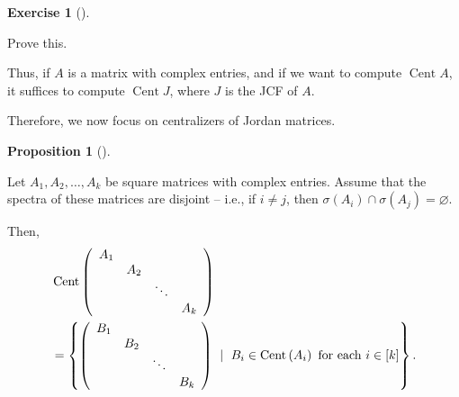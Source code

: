 \documentclass[numbers=enddot,12pt,final,onecolumn,notitlepage]{scrartcl}%
\newcounter{exer}
\numberwithin{exer}{subsection}
\theoremstyle{definition}
\newtheorem{prop}[theo]{Proposition}
\newenvironment{proposition}[1][]
{\begin{prop}[#1]\begin{leftbar}}
{\end{leftbar}\end{prop}}
\newtheorem{exmp}[exer]{Exercise}
\newenvironment{exercise}[1][]
{\begin{exmp}[#1]\begin{leftbar}}
{\end{leftbar}\end{exmp}}
\begin{document}
\begin{exercise}
 Prove this.
\end{exercise}

Thus, if $A$ is a matrix with complex entries, and if we want to compute
$\operatorname*{Cent}A$, it suffices to compute $\operatorname*{Cent}J$, where
$J$ is the JCF of $A$.

Therefore, we now focus on centralizers of Jordan matrices.

\begin{proposition}
Let $A_{1},A_{2},\ldots,A_{k}$ be square matrices with complex entries. Assume
that the spectra of these matrices are disjoint -- i.e., if $i\neq j$, then
$\sigma\left(  A_{i}\right)  \cap\sigma\left(  A_{j}\right)  =\varnothing$.

Then,%
\begin{align*}
&  \operatorname*{Cent}\left(
\begin{array}
[c]{cccc}%
A_{1} &  &  & \\
& A_{2} &  & \\
&  & \ddots & \\
&  &  & A_{k}%
\end{array}
\right) \\
&  =\left\{  \left(
\begin{array}
[c]{cccc}%
B_{1} &  &  & \\
& B_{2} &  & \\
&  & \ddots & \\
&  &  & B_{k}%
\end{array}
\right)  \ \mid\ B_{i}\in\operatorname*{Cent}\left(  A_{i}\right)  \text{ for
each }i\in\left[  k\right]  \right\}  .
\end{align*}

\end{proposition}
\end{document}
